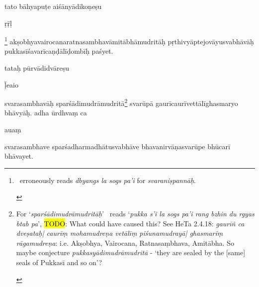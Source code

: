 \documentclass[naipra.tex]{subfiles}
\begin{document}
\begin{sanskrit}


\pstart
tato bāhyapuṭe aiśānyādikoṇeṣu \begin{mantra}\dsh ṛ\dsh ṝ\dsh ḷ\end{mantra}\dsh {}\footnote{\begin{english}
	\TIB\ erroneously reads \emph{dbyangs la sogs pa'i} for \emph{svaraniṣpannāḥ}. 
\end{english}} akṣobhyavairocanaratnasambhavāmitābhāmudritāḥ pṛthivyāptejovāyusvabhāvāḥ pukkasīśavarīcaṇḍālīḍombīḥ paśyet. 
\pend


\pstart
tataḥ pūrvādidvāreṣu \begin{mantra}ḹ\dsh e\dsh ai\dsh o\end{mantra}\dsh svarasambhavāḥ sparśādimudrāmudritā\footnote{\begin{english}
	For `\emph{sparśādimudrāmudritāḥ}' \TIB\ reads `\emph{pukka s'i la sogs pa'i rang bzhin du rgyas btab pa}', 
	\hl{TODO}: What could have caused this? See HeTa 2.4.18: \emph{gaurīñ ca dveṣataḥ| caurīṃ mohamudreṇa vetālīṃ piśunamudrayā| ghasmarīṃ rāgamudreṇa}: i.e. Akṣobhya, Vairocana, Ratnasaṃbhava, Amitābha.
	So maybe conjecture \emph{pukkasyādimudrāmudritā} - `they are sealed by the [same] seals of Pukkasī and so on'?
\end{english}} svarūpā gaurīcaurīvettālīghasmaryo bhāvyāḥ. 
 adha ūrdhvaṃ ca  \begin{mantra}au\dsh aṃ\end{mantra}\dsh svarasambhave sparśadharmadhātusvabhāve bhavanirvāṇasvarūpe bhūcarī bhāvayet.
\pend


\end{sanskrit}
\end{document}
